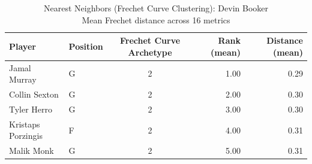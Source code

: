 \begin{table}[t]
\caption*{
{\fontsize{20}{25} Nearest Neighbors (Frechet Curve Clustering): Devin Booker\fontsize{12}{15}\selectfont } \\ 
{\fontsize{14}{17}\selectfont  Mean Frechet distance across 16 metrics\fontsize{12}{15}\selectfont }
} 
\fontsize{12.0pt}{14.0pt}\selectfont
\begin{tabular*}{\linewidth}{@{\extracolsep{\fill}}llcrr}
\toprule
Player & Position & Frechet Curve Archetype & Rank (mean) & Distance (mean) \\ 
\midrule\addlinespace[2.5pt]
Jamal Murray & G & 2 & 1.00 & 0.29 \\ 
Collin Sexton & G & 2 & 2.00 & 0.30 \\ 
Tyler Herro & G & 2 & 3.00 & 0.30 \\ 
Kristaps Porzingis & F & 2 & 4.00 & 0.31 \\ 
Malik Monk & G & 2 & 5.00 & 0.31 \\ 
\bottomrule
\end{tabular*}
\end{table}

